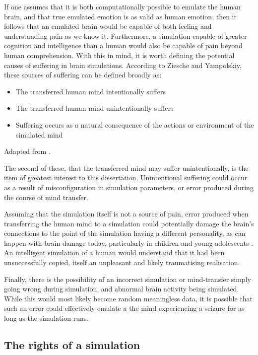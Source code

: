 If one assumes that it is both computationally possible to emulate the human
brain, and that true emulated emotion is as valid as human emotion,
then it follows that an emulated brain would be capable of both feeling and
understanding pain as we know it. Furthermore, a simulation capable of greater
cognition and intelligence than a human would also be capable of pain beyond
human comprehension. With this in mind, it is worth defining the potential
causes of suffering in brain simulations. According to Ziesche and Yampolskiy,
these sources of suffering can be defined broadly as:
\begin{itemize}
    \itemsep-0.2em
    \item The transferred human mind intentionally suffers
    \item The transferred human mind unintentionally suffers
    \item Suffering occurs as a natural consequence of the actions or
    environment of the simulated mind
\end{itemize}
Adapted from \autocite{ziesche_no_2019-1}.

The second of these, that the transferred mind may suffer unintentionally, is
the item of greatest interest to this dissertation. Unintentional suffering
could occur as a result of misconfiguration in simulation parameters, or error
produced during the course of mind transfer. 

Assuming that the simulation itself is not a source of pain, error produced when
transferring the human mind to a simulation could potentially damage the brain's
connections to the point of the simulation having a different personality, as
can happen with brain damage today, particularly in children and young
adolescents \autocite{max_personality_2015}. An intelligent simulation of a
human would understand that it had been unsuccessfully copied, itself an
unpleasant and likely traumatising realisation.

Finally, there is the possibility of an incorrect simulation or mind-transfer
simply going wrong during simulation, and abnormal brain activity being
simulated. While this would most likely become random meaningless data, it is
possible that such an error could effectively emulate a the mind
experiencing a seizure for as long as the simulation runs. 
 
\subsection{The rights of a simulation}

